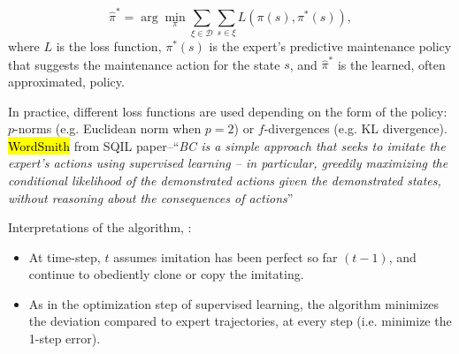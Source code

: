 \documentclass{article}
\newcommand{\hlc}[2][blue!10]{{\colorlet{foo}{#1} \sethlcolor{foo}\hl{#2}}}
\begin{document}
\begin{equation}\label{eq:BC}
	\hat{\pi}^* = \arg\min_{\pi} \sum_{\xi \in \mathcal{D}} \sum_{s \in \xi} L(\pi(s), \pi^*(s)),
\end{equation}
where $L$ is the loss function, $\pi^*(s)$ is the expert's predictive maintenance policy that suggests the maintenance action for the state $s$, and $\hat{\pi}^*$ is the learned, often approximated, policy.

In practice, different loss functions are used depending on the form of the policy: $p$-norms (e.g. Euclidean norm when $p=2$) or $f$-divergences (e.g. KL divergence).\\


\hlc{WordSmith} from \cite{reddy2019sqil} SQIL paper--``\textit{BC is a simple approach that seeks to imitate the expert’s actions using supervised learning – in particular, greedily maximizing the conditional likelihood of the demonstrated actions given the demonstrated states, without reasoning about the consequences of actions}''
	
Interpretations of the algorithm,  \citep{yue2018imitation}:
\begin{itemize}
	\item At time-step, $t$ assumes imitation has been perfect so far $(t-1)$, and continue to obediently clone or copy the imitating.
	\item As in the optimization step of supervised learning, the algorithm minimizes the deviation compared to expert trajectories, at every step (i.e. minimize the 1-step error).
\end{itemize}

%
\end{document}
